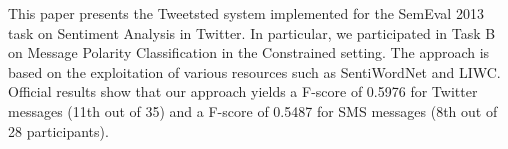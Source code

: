 This paper presents the Tweetsted system implemented for the SemEval 2013 task on Sentiment Analysis in Twitter. In particular, we participated in Task B on
 Message Polarity Classification in the Constrained setting. The approach is
 based on the exploitation of various resources such as SentiWordNet and LIWC.
 Official results show that our approach yields a F-score of 0.5976 for Twitter
 messages (11th out of 35) and a F-score of 0.5487 for SMS messages (8th out of
 28 participants).

